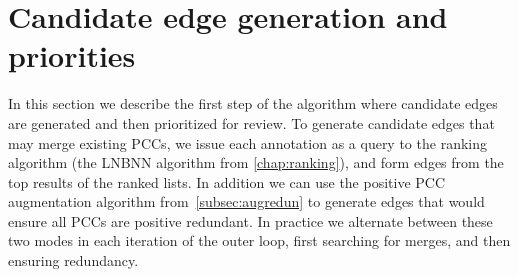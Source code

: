 


\section{Candidate edge generation and priorities}\label{sec:cand}

In this section we describe the first step of the algorithm where candidate edges are generated and then
  prioritized for review.
To generate candidate edges that may merge existing PCCs, we issue each annotation as a query to the ranking
  algorithm (the LNBNN algorithm from \cref{chap:ranking}), and form edges from the top results of the ranked
  lists.
In addition we can use the positive PCC augmentation algorithm from~\cref{subsec:augredun} to generate edges that
  would ensure all PCCs are positive redundant.
In practice we alternate between these two modes in each iteration of the outer loop, first searching for merges,
  and then ensuring redundancy.

